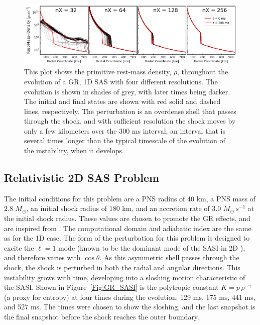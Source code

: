 \documentclass[letterpaper]{jpconf}
\newcommand{\figref}[1]{Figure~\ref{#1}}
\begin{document}
\begin{figure}
\centering
\includegraphics[width=\textwidth]{Images/SAS1D.png}
\caption{This plot shows the primitive rest-mass density, $\rho$, throughout the evolution of a GR, 1D SAS with four different resolutions. The evolution is shown in shades of grey, with later times being darker. The initial and final states are shown with red solid and dashed lines, respectively. The perturbation is an overdense shell that passes through the shock, and with sufficient resolution the shock moves by only a few kilometers over the 300 ms interval, an interval that is several times longer than the typical timescale of the evolution of the instability, when it develops.}
\label{Fig:GR_SAS}
\end{figure}

\subsection{Relativistic 2D SAS Problem}

The initial conditions for this problem are a PNS radius of 40 km, a PNS mass of 2.8 $M_{\odot}$, an initial shock radius of $180$ km, and an accretion rate of 3.0 $M_{\odot}\,s^{-1}$ at the initial shock radius. These values are chosen to promote the GR effects, and are inspired from \cite{Walk2006}. The computational domain and adiabatic index are the same as for the 1D case. The form of the perturbation for this problem is designed to excite the $\ell=1$ mode (known to be the dominant mode of the SASI in 2D \cite{BlondinMezzacappa2006}), and therefore varies with $\cos\theta$. As this asymmetric shell passes through the shock, the shock is perturbed in both the radial and angular directions. This instability grows with time, developing into a sloshing motion characteristic of the SASI. Shown in \figref{Fig:GR_SASI} is the polytropic constant $K=p\,\rho^{-\gamma}$ (a proxy for entropy) at four times during the evolution: 129 ms, 175 ms, 441 ms, and 527 ms. The times were chosen to show the sloshing, and the last snapshot is the final snapshot before the shock reaches the outer boundary.
\end{document}
